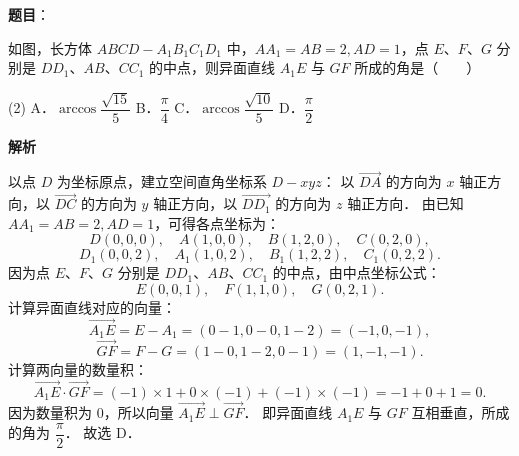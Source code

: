 \begin{answer}

\textbf{题目}：

如图，长方体 $ABCD - A_1B_1C_1D_1$ 中，$AA_1 = AB = 2, AD = 1$，点 $E$、$F$、$G$ 分别是 $DD_1$、$AB$、$CC_1$ 的中点，则异面直线 $A_1E$ 与 $GF$ 所成的角是\mbox{（　　）}
\nopagebreak[4]
\begin{center}\end{center}
\nopagebreak[4]
\begin{gkopts}(2)
\task A．$\arccos\dfrac{\sqrt{15}}{5}$
\task B．$\dfrac{\pi}{4}$
\task C．$\arccos\dfrac{\sqrt{10}}{5}$
\task D．$\dfrac{\pi}{2}$
\end{gkopts}

\textbf{解析}

以点 $D$ 为坐标原点，建立空间直角坐标系 $D-xyz$：
以 $\overrightarrow{DA}$ 的方向为 $x$ 轴正方向，以 $\overrightarrow{DC}$ 的方向为 $y$ 轴正方向，以 $\overrightarrow{DD_1}$ 的方向为 $z$ 轴正方向．
由已知 $AA_1 = AB = 2, AD = 1$，可得各点坐标为：
\nopagebreak[4]
\[
D(0, 0, 0), \quad A(1, 0, 0), \quad B(1, 2, 0), \quad C(0, 2, 0),
\]
\nopagebreak[4]
\[
D_1(0, 0, 2), \quad A_1(1, 0, 2), \quad B_1(1, 2, 2), \quad C_1(0, 2, 2).
\]
因为点 $E$、$F$、$G$ 分别是 $DD_1$、$AB$、$CC_1$ 的中点，由中点坐标公式：
\nopagebreak[4]
\[
E(0, 0, 1), \quad F(1, 1, 0), \quad G(0, 2, 1).
\]
计算异面直线对应的向量：
\nopagebreak[4]
\[
\overrightarrow{A_1E} = E - A_1 = (0 - 1, 0 - 0, 1 - 2) = (-1, 0, -1),
\]
\nopagebreak[4]
\[
\overrightarrow{GF} = F - G = (1 - 0, 1 - 2, 0 - 1) = (1, -1, -1).
\]
计算两向量的数量积：
\nopagebreak[4]
\[
\overrightarrow{A_1E} \cdot \overrightarrow{GF} = (-1) \times 1 + 0 \times (-1) + (-1) \times (-1) = -1 + 0 + 1 = 0.
\]
因为数量积为 0，所以向量 $\overrightarrow{A_1E} \perp \overrightarrow{GF}$．
即异面直线 $A_1E$ 与 $GF$ 互相垂直，所成的角为 $\dfrac{\pi}{2}$．
故选 D．


\end{answer}
